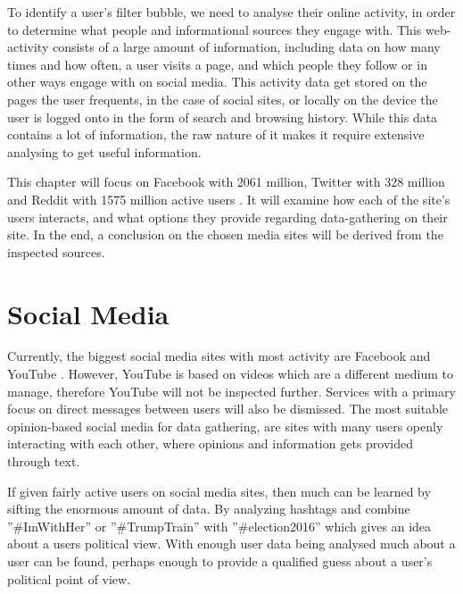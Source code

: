 
To identify a user's filter bubble, we need to analyse their online activity, in
order to determine what people and informational sources they engage with. This
web-activity consists of a large amount of information, including data on how
many times and how often, a user visits a page, and which people they follow or
in other ways engage with on social media. This activity data get stored on the
pages the user frequents, in the case of social sites, or locally on the device
the user is logged onto in the form of search and browsing history. While this
data contains a lot of information, the raw nature of it makes it require
extensive analysing to get useful information.\nl


This chapter will focus on Facebook with 2061 million, Twitter with 328 million
and Reddit with 1575 million active users \citep{SocialMediaStats, RedditStats}.
It will examine how each of the site's users interacts, and what options they
provide regarding data-gathering on their site. In the end, a conclusion on the
chosen media sites will be derived from the inspected sources.

\section{Social Media}
Currently, the biggest social media sites with most activity are Facebook and
YouTube \citep{SocialMediaStats}. However, YouTube is based on videos which are
a different medium to manage, therefore YouTube will not be inspected further.
Services with a primary focus on direct messages between users will also be
dismissed. The most suitable opinion-based social media for data gathering, are
sites with many users openly interacting with each other, where opinions and
information gets provided through text.\nl

If given fairly active users on social media sites, then much can be learned by
sifting the enormous amount of data. By analyzing hashtags and combine
”\#ImWithHer” or ”\#TrumpTrain” with ”\#election2016” which gives an idea about
a users political view. With enough user data being analysed much about a user
can be found, perhaps enough to provide a qualified guess about a user's
political point of view.\nl


